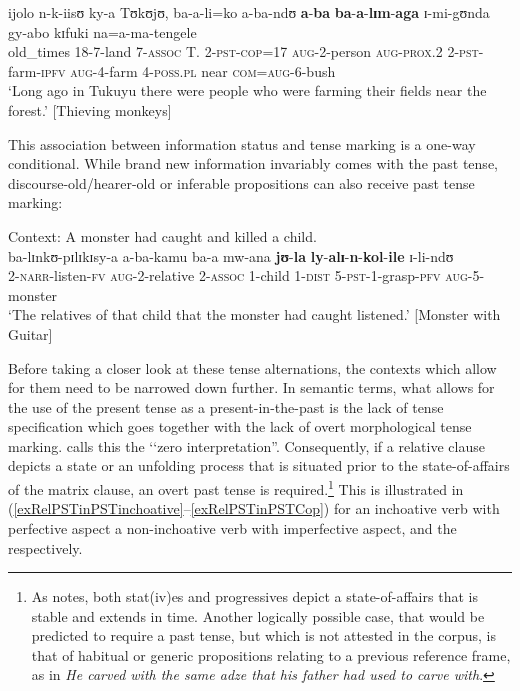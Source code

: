 \begin{exe}
\ex \label{exRelativeClausePSTorientation}%
\gll ijolo n-k-iisʊ ky-a Tʊkʊjʊ, ba-a-li=ko a-ba-ndʊ \textbf{a}-\textbf{ba} \textbf{ba}-\textbf{a}-\textbf{lɪm}-\textbf{aga} ɪ-mi-gʊnda gy-abo kɪfuki na=a-ma-tengele\\
old\_times 18-7-land 7-\textsc{assoc} T. 2-\textsc{pst}-\textsc{cop}=17 \textsc{aug}-2-person \textsc{aug}-\textsc{prox.2} 2-\textsc{pst}-farm-\textsc{ipfv} \textsc{aug}-4-farm 4-\textsc{poss.pl} near \textsc{com}=\textsc{aug}-6-bush\\
\glt \lq Long ago in Tukuyu there were people who were farming their fields near the forest.' [Thieving monkeys] 
\end{exe}

\largerpage
This association between information status and tense marking is a one-way conditional. While brand new information invariably comes with the past tense, discourse-old/hearer-old or inferable propositions can also receive past tense marking:

\begin{exe}
\ex \label{exRelativeClausePSTalsoOldInformation}
Context: A monster had caught and killed a child.\\
\gll ba-lɪnkʊ-pɪlɪkɪsy-a a-ba-kamu ba-a mw-ana \textbf{jʊ}-\textbf{la} \textbf{ly}-\textbf{alɪ}-\textbf{n}-\textbf{kol}-\textbf{ile} ɪ-li-ndʊ\\
2-\textsc{narr}-listen-\textsc{fv} \textsc{aug}-2-relative 2-\textsc{assoc} 1-child 1-\textsc{dist} 5-\textsc{pst}-1-grasp-\textsc{pfv} \textsc{aug}-5-monster\\
\glt \lq The relatives of that child that the monster had caught listened.'
[Monster with Guitar]
\end{exe}

Before taking a closer look at these tense alternations, the contexts which allow for them need to be narrowed down further. In semantic terms, what allows for the use of the present tense as a present-in-the-past is the lack of tense specification which goes together with the lack of overt morphological tense marking. \citet{FleischmanS1990} calls this the \lq\lq zero interpretation''. Consequently, if a relative clause depicts a state or an unfolding process that is situated prior to the state-of-affairs of the matrix clause, an overt past tense is required.\footnote{As \citet[84]{SmithC1997} notes, both stat(iv)es and progressives depict a state-of-affairs that is stable and extends in time. Another logically possible case, that would be predicted to require a past tense, but which is not attested in the corpus, is that of habitual or generic propositions relating to a previous reference frame, as in \textit{He carved with the same adze that his father had used to carve with}.} This is illustrated in (\ref{exRelPSTinPSTinchoative}--\ref{exRelPSTinPSTCop}) for an inchoative verb with perfective aspect a non-inchoative verb with imperfective aspect, and the  respectively.


